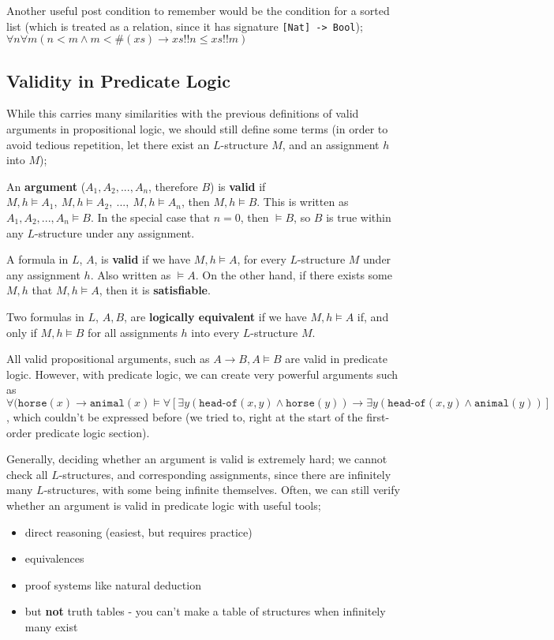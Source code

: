 \documentclass[a4paper, 12pt]{article}
\begin{document}
                Another useful post condition to remember would be the condition for a sorted list (which is treated as a relation, since it has signature \texttt{[Nat] -> Bool}); $\forall n \forall m (n < m \land m < \#(xs) \rightarrow xs!!n \leq xs!!m)$
        \subsection*{Validity in Predicate Logic}
            While this carries many similarities with the previous definitions of valid arguments in propositional logic, we should still define some terms (in order to avoid tedious repetition, let there exist an $L$-structure $M$, and an assignment $h$ into $M$);
            \medskip

            An \textbf{argument} ($A_1, A_2, ..., A_n$, therefore $B$) is \textbf{valid} if $M, h \vDash A_1,\ M, h \vDash A_2,\ ...,\ M, h \vDash A_n$, then $M, h \vDash B$. This is written as $A_1, A_2, ..., A_n \vDash B$. In the special case that $n = 0$, then $\vDash B$, so $B$ is true within any $L$-structure under any assignment.
            \medskip

            A formula in $L$, $A$, is \textbf{valid} if we have $M, h \vDash A$, for every $L$-structure $M$ under any assignment $h$. Also written as $\vDash A$. On the other hand, if there exists some $M, h$ that $M, h \vDash A$, then it is \textbf{satisfiable}.
            \medskip

            Two formulas in $L$, $A, B$, are \textbf{logically equivalent} if we have $M, h \vDash A$ if, and only if $M, h \vDash B$ for all assignments $h$ into every $L$-structure $M$.
            \medskip

            All valid propositional arguments, such as $A \rightarrow B, A \vDash B$ are valid in predicate logic. However, with predicate logic, we can create very powerful arguments such as $\forall(\texttt{horse}(x) \rightarrow \texttt{animal}(x) \vDash \forall [\exists y (\texttt{head-of}(x, y) \land \texttt{horse}(y)) \rightarrow \exists y (\texttt{head-of}(x, y) \land \texttt{animal}(y))]$, which couldn't be expressed before (we tried to, right at the start of the first-order predicate logic section).
            \medskip

            Generally, deciding whether an argument is valid is extremely hard; we cannot check all $L$-structures, and corresponding assignments, since there are infinitely many $L$-structures, with some being infinite themselves. Often, we can still verify whether an argument is valid in predicate logic with useful tools;
            \begin{itemize}
                \itemsep0em
                \item direct reasoning (easiest, but requires practice)
                \item equivalences
                \item proof systems like natural deduction
                \item but \textbf{not} truth tables - you can't make a table of structures when infinitely many exist
            \end{itemize}
\end{document}
